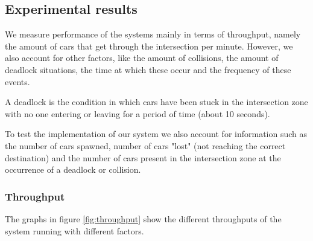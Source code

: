 \subsection{Experimental results}

We measure performance of the systems mainly in terms of throughput, namely the amount of cars that get through the intersection per minute.
However, we also account for other factors, like the amount of collisions, the amount of deadlock situations, the time at which these occur and the frequency of these events.

A deadlock is the condition in which cars have been stuck in the intersection zone with no one entering or leaving for a period of time (about 10 seconds).

To test the implementation of our system we also account for information such as the number of cars spawned, number of cars "lost" (not reaching the correct destination) and the number of cars present in the intersection zone at the occurrence of a deadlock or collision.

\subsubsection{Throughput}
The graphs in figure \ref{fig:throughput} show the different throughputs of the system running with different factors.

